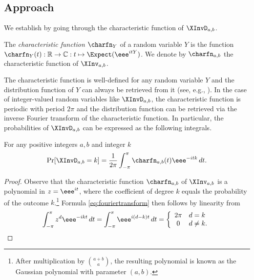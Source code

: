 \documentclass{toc}
\begin{document}
\subsection{Approach}

We establish  by going through the characteristic function of $\XInvD_{a,b}$. 
\begin{definition}
The \emph{characteristic function} $\charfn_Y$ of a random variable $Y$ is the function $\charfn_Y(t):\mathbb{R}\to\mathbb{C}: t \mapsto \Expect(\eee^{itY})$. We denote by $\charfn_{a,b}$ the characteristic function of $\XInv_{a,b}$.
\end{definition}
The characteristic function is well-defined for any random variable $Y$ and the distribution function of $Y$ can always be retrieved from it (see, e.g., \cite[Chapter VI]{Renyi}). In the case of integer-valued random variables like $\XInvD_{a,b}$, the characteristic function is periodic with period $2\pi$ and the distribution function can be retrieved via the inverse Fourier transform of the characteristic function. In particular, the probabilities of $\XInvD_{a,b}$ can be expressed as the following integrals.
\begin{fact}
For any positive integers $a,b$ and integer $k$
\begin{equation}
    \label{eq:fouriertransform}
    \Pr[\XInvD_{a,b}=k] = \frac{1}{2\pi} \int_{-\pi}^{\pi}\charfn_{a,b}(t)\eee^{-itk}\,dt.
\end{equation}
\end{fact}
\begin{proof}
Observe that the characteristic function $\charfn_{a,b}$ of $\XInv_{a,b}$ is a polynomial in $z=\eee^{it}$, where the coefficient of degree $k$ equals the probability of the outcome $k$.\footnote{After multiplication by $\binom{a+b}{a}$, the resulting polynomial is known as the Gaussian polynomial with parameter $(a,b)$.} 
Formula \eqref{eq:fouriertransform} then follows by linearity from
\[
\int_{-\pi}^\pi z^d \eee^{-ikt} \, dt = 
\int_{-\pi}^\pi \eee^{i(d-k)t} \, dt =
\left\{ \begin{array}{cl} 2\pi & d=k \\
                             0 & d \ne k.
\end{array} \right.
\]
\end{proof}
\end{document}
